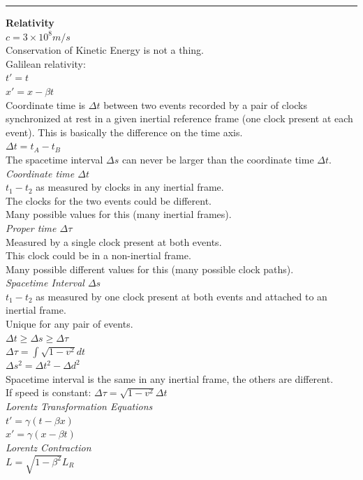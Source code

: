 \documentclass[0pt]{report}
\begin{document}
\begin{multicols*}{3}
\begin{flushleft}
\noindent\rule[0.5ex]{\linewidth}{1pt}
\textbf{Relativity}\\
$c=3\times10^8m/s$\\
Conservation of Kinetic Energy is not a thing.\\
Galilean relativity:\\
$t'=t$\\
$x'=x-\beta t$\\
Coordinate time is $\Delta t$ between two events recorded by a pair of clocks synchronized at rest in a given inertial reference frame (one clock present at each event). This is basically the difference on the time axis.\\
$\Delta t=t_A-t_B$\\
The spacetime interval $\Delta s$ can never be larger than the coordinate time $\Delta t$.
\textsl{Coordinate time $\Delta t$}\\
$t_1-t_2$ as measured by clocks in any inertial frame.\\
The clocks for the two events could be different.\\
Many possible values for this (many inertial frames).\\
\textsl{Proper time $\Delta \tau$}\\
Measured by a single clock present at both events.\\
This clock could be in a non-inertial frame.\\
Many possible different values for this (many possible clock paths).\\
\textsl{Spacetime Interval $\Delta s$}\\
$t_1-t_2$ as measured by one clock present at both events and attached to an inertial frame.\\
Unique for any pair of events.\\
$\Delta t\geq\Delta s\geq\Delta\tau$\\
$\Delta \tau=\int\sqrt{1-v^2}dt$\\
$\Delta s^2=\Delta t^2-\Delta d^2$\\
Spacetime interval is the same in any inertial frame, the others are different.\\
If speed is constant: $\Delta\tau=\sqrt{1-v^2}\Delta t$\\
\textsl{Lorentz Transformation Equations}\\
$t'=\gamma(t-\beta x)$\\
$x'=\gamma(x-\beta t)$\\
\textsl{Lorentz Contraction}\\
$L=\sqrt{1-\beta^2}L_R$\\

\end{flushleft}
\end{multicols*}
\end{document}
